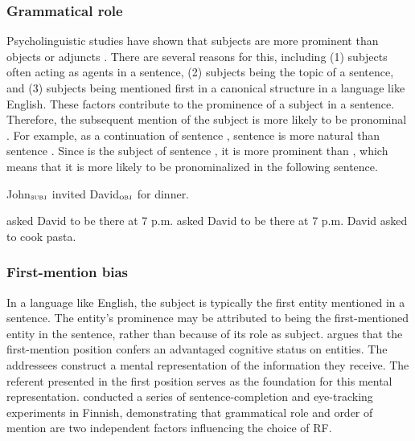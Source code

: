 \subsubsection{Grammatical role} 
Psycholinguistic studies have shown that subjects are more prominent than objects or adjuncts \citep{Stevenson1994,Arnold2000a,Fukumura2010,}. There are several reasons for this, including
(1) subjects often acting as agents in a sentence,
(2) subjects being the topic of a sentence, and (3) subjects being mentioned first in a canonical structure in a language like English. These factors contribute to the prominence of a subject in a sentence. Therefore, the subsequent mention of the subject is more likely to be pronominal \citep{Brennan1995,arnold2008reference, Arnold2010}. For example, as a continuation of sentence , sentence  is more natural than sentence . Since  is the subject of sentence , it is more prominent than , which means that it is more likely to be pronominalized in the following sentence.

\begin{exe}
	\ex John$_{\textsc{subj}}$ invited David$_{\textsc{obj}}$ for dinner. \label{ex:syn}
	\ex
	\begin{xlist}
		\ex {} asked David to be there at 7 p.m. \label{ex:syn_subj}
		\ex {} asked David to be there at 7 p.m. \label{ex:syn_obj}
		\ex David asked  to cook pasta. \label{ex:syn_nonparal}
	\end{xlist}
\end{exe}




\subsubsection{First-mention bias} 
In a language like English, the subject is typically the first entity mentioned in a sentence. The entity's prominence may be attributed to being the first-mentioned entity in the sentence, rather than because of its role as subject. \citet{Gernsbacher1989} argues that the first-mention position confers an advantaged cognitive status on entities. The addressees construct a mental representation of the information they receive. The referent presented in the first position serves as the foundation for this mental representation. \citet{Kaiser2011} conducted a series of sentence-completion and eye-tracking experiments in Finnish, demonstrating that grammatical role and order of mention are two independent factors influencing the choice of RF.

